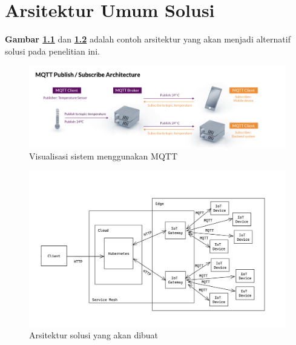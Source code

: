 \chapter{Arsitektur Umum Solusi}
\label{appendix:gambaran-umum-solusi}
\textbf{Gambar \ref{fig:mqtt-architecture-image}} dan \textbf{\ref{fig:appendix-gambaran-umum-solusi}} adalah contoh arsitektur yang akan menjadi alternatif solusi pada penelitian ini.

\begin{figure}[h]
  \centering
  \includegraphics[width=1\textwidth]{resources/appendix/arsitektur-mqtt.jpg}
  \caption{Visualisasi sistem menggunakan MQTT \parencite{mqtt}}
  \label{fig:mqtt-architecture-image}
\end{figure}

\begin{figure}[h]
  \centering
  \includegraphics[width=1\textwidth]{resources/appendix/gambaran-umum-solusi.jpg}
  \caption{Arsitektur solusi yang akan dibuat}
  \label{fig:appendix-gambaran-umum-solusi}
\end{figure}